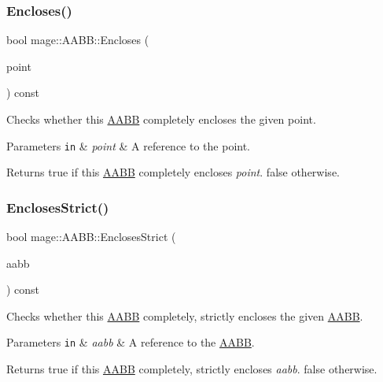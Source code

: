 \subsubsection{\texorpdfstring{Encloses()}{Encloses()}\hspace{0.1cm}{\footnotesize\ttfamily [2/2]}}
{\footnotesize\ttfamily bool mage\+::\+A\+A\+B\+B\+::\+Encloses (\begin{DoxyParamCaption}\item[{const \hyperlink{structmage_1_1_point3}{Point3} \&}]{point }\end{DoxyParamCaption}) const}

Checks whether this \hyperlink{structmage_1_1_a_a_b_b}{A\+A\+BB} completely encloses the given point.


\begin{DoxyParams}[1]{Parameters}
\mbox{\tt in}  & {\em point} & A reference to the point. \\
\hline
\end{DoxyParams}
\begin{DoxyReturn}{Returns}
{\ttfamily true} if this \hyperlink{structmage_1_1_a_a_b_b}{A\+A\+BB} completely encloses {\itshape point}. {\ttfamily false} otherwise. 
\end{DoxyReturn}
\hypertarget{structmage_1_1_a_a_b_b_a3bb59de6eca634cb3ddec4ad314fde21}{}\label{structmage_1_1_a_a_b_b_a3bb59de6eca634cb3ddec4ad314fde21} 
\subsubsection{\texorpdfstring{Encloses\+Strict()}{EnclosesStrict()}\hspace{0.1cm}{\footnotesize\ttfamily [1/2]}}
{\footnotesize\ttfamily bool mage\+::\+A\+A\+B\+B\+::\+Encloses\+Strict (\begin{DoxyParamCaption}\item[{const \hyperlink{structmage_1_1_a_a_b_b}{A\+A\+BB} \&}]{aabb }\end{DoxyParamCaption}) const}

Checks whether this \hyperlink{structmage_1_1_a_a_b_b}{A\+A\+BB} completely, strictly encloses the given \hyperlink{structmage_1_1_a_a_b_b}{A\+A\+BB}.


\begin{DoxyParams}[1]{Parameters}
\mbox{\tt in}  & {\em aabb} & A reference to the \hyperlink{structmage_1_1_a_a_b_b}{A\+A\+BB}. \\
\hline
\end{DoxyParams}
\begin{DoxyReturn}{Returns}
{\ttfamily true} if this \hyperlink{structmage_1_1_a_a_b_b}{A\+A\+BB} completely, strictly encloses {\itshape aabb}. {\ttfamily false} otherwise. 
\end{DoxyReturn}
\hypertarget{structmage_1_1_a_a_b_b_a436950a97b647179506bb42a3f2f2b34}{}\label{structmage_1_1_a_a_b_b_a436950a97b647179506bb42a3f2f2b34} 
